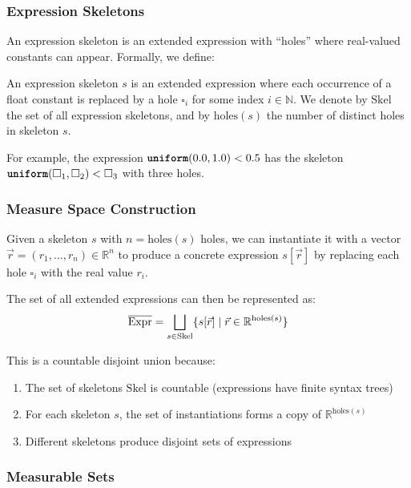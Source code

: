 \subsubsection{Expression Skeletons}

An expression skeleton is an extended expression with ``holes'' where real-valued constants can appear. Formally, we define:

\begin{definition}
An expression skeleton $s$ is an extended expression where each occurrence of a float constant is replaced by a hole $\square_i$ for some index $i \in \mathbb{N}$. We denote by $\text{Skel}$ the set of all expression skeletons, and by $\text{holes}(s)$ the number of distinct holes in skeleton $s$.
\end{definition}

For example, the expression $\textnormal{\ttfamily\bfseries uniform}(0.0, 1.0) < 0.5$ has the skeleton $\textnormal{\ttfamily\bfseries uniform}(\square_1, \square_2) < \square_3$ with three holes.

\subsubsection{Measure Space Construction}

Given a skeleton $s$ with $n = \text{holes}(s)$ holes, we can instantiate it with a vector $\vec{r} = (r_1, \ldots, r_n) \in \mathbb{R}^n$ to produce a concrete expression $s[\vec{r}]$ by replacing each hole $\square_i$ with the real value $r_i$.

The set of all extended expressions can then be represented as:
\[
{\overline{\textnormal{Expr}}} = \bigsqcup_{s \in \text{Skel}} \{s[\vec{r}] \mid \vec{r} \in \mathbb{R}^{\text{holes}(s)}\}
\]

This is a countable disjoint union because:
\begin{enumerate}
    \item The set of skeletons $\text{Skel}$ is countable (expressions have finite syntax trees)
    \item For each skeleton $s$, the set of instantiations forms a copy of $\mathbb{R}^{\text{holes}(s)}$
    \item Different skeletons produce disjoint sets of expressions
\end{enumerate}

\subsubsection{Measurable Sets}

